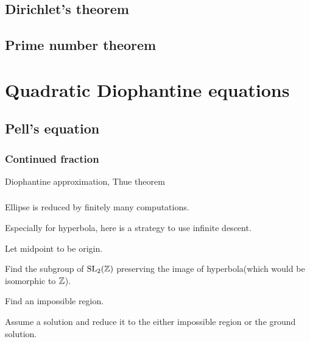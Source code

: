 \documentclass{../../large}
\begin{document}
\chapter{Dirichlet's theorem}
\chapter{Prime number theorem}




\part{Quadratic Diophantine equations}
\chapter{Pell's equation}
\section{Continued fraction}
Diophantine approximation, Thue theorem

\section{}
Ellipse is reduced by finitely many computations.


Especially for hyperbola, here is a strategy to use infinite descent.
\begin{parts}
\item Let midpoint to be origin.
\item Find the subgroup of $\mathrm{SL}_2(\mathbb{Z})$ preserving the image of hyperbola(which would be isomorphic to $\mathbb{Z}$).
\item Find an impossible region.
\item Assume a solution and reduce it to the either impossible region or the ground solution.
\end{parts}
\end{document}
